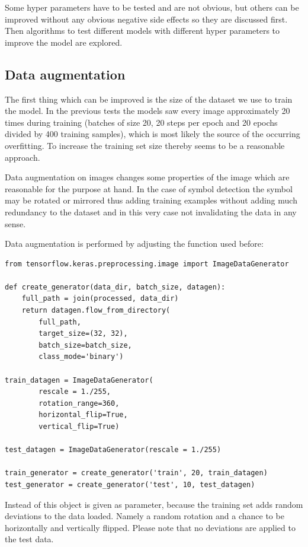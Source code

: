 Some hyper parameters have to be tested and are not obvious, but others can be improved without any obvious negative side effects so they are discussed first. Then algorithms to test different models with different hyper parameters to improve the model are explored.

\subsection{Data augmentation}\label{ch:data_augmentation}
The first thing which can be improved is the size of the dataset we use to train the model.
In the previous tests the models saw every image approximately 20 times during training (batches of size 20, 20 steps per epoch and 20 epochs divided by 400 training samples), which is most likely the source of the occurring overfitting.
To increase the training set size thereby seems to be a reasonable approach.

Data augmentation on images changes some properties of the image which are reasonable for the purpose at hand.
In the case of symbol detection the symbol may be rotated or mirrored thus adding training examples without adding much redundancy to the dataset and in this very case not invalidating the data in any sense.

Data augmentation is performed by adjusting the  function used before:

\begin{lstlisting}
from tensorflow.keras.preprocessing.image import ImageDataGenerator

def create_generator(data_dir, batch_size, datagen):
    full_path = join(processed, data_dir)
    return datagen.flow_from_directory(
        full_path,
        target_size=(32, 32),
        batch_size=batch_size,
        class_mode='binary')

train_datagen = ImageDataGenerator(
        rescale = 1./255,
        rotation_range=360,
        horizontal_flip=True,
        vertical_flip=True)

test_datagen = ImageDataGenerator(rescale = 1./255)

train_generator = create_generator('train', 20, train_datagen)
test_generator = create_generator('test', 10, test_datagen)
\end{lstlisting}

Instead of  this object is given as parameter, because the training set adds random deviations to the data loaded. Namely a random rotation and a chance to be horizontally and vertically flipped.
Please note that no deviations are applied to the test data.

